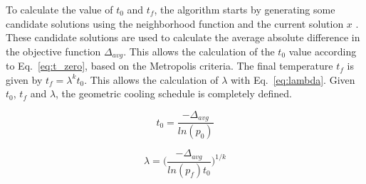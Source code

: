 To calculate the value of $t_0$ and $t_f$, the algorithm starts by generating some candidate solutions using the neighborhood function and the current solution $x$ \cite{SA_methods}. These candidate solutions are used to calculate the average absolute difference in the objective function $\Delta_{avg}$. This allows the calculation of the  $t_0$ value according to Eq.~\ref{eq:t_zero}, based on the Metropolis criteria. The final temperature $t_f$ is given by $t_f = \lambda^{k}t_0$. This allows the calculation of $\lambda$ with Eq.~\ref{eq:lambda}. Given $t_0$, $t_f$ and $\lambda$, the geometric cooling schedule is completely defined.

\begin{equation}
\label{eq:t_zero}
    t_0 = \frac{-\Delta_{avg}}{ln(p_0)}
\end{equation}

\begin{equation}
\label{eq:lambda}
    \lambda = \bigg( \frac{-\Delta_{avg}}{ln(p_f)t_0} \bigg)^{1/k}
\end{equation}















